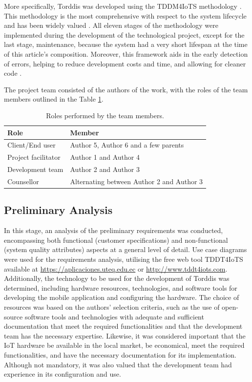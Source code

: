 \documentclass[a4paper,fleqn]{cas-sc}
\begin{document}
		More specifically, Torddis was developed using the TDDM4IoTS methodology \citep{Guerrero-Ulloa2020TDDM4IoTS}. This methodology is the most comprehensive with respect to the system lifecycle \citep{Guerrero-Ulloa2023Review} and has been widely valued \citep{Guerrero-Ulloa2023DevIdeAir,Guerrero-Ulloa2023IdeAir,Guerrero-Ulloa2023SP4,Guerrero-Ulloa2023Nawi}. All eleven stages of the methodology were implemented during the development of the technological project, except for the last stage, maintenance, because the system had a very short lifespan at the time of this article's composition. Moreover, this framework aids in the early detection of errors, helping to reduce development costs and time, and allowing for cleaner code \citep{Beck2002TDD}.
		
		The project team consisted of the authors of the work, with the roles of the team members outlined in the Table \ref{tab:Roles}.
		
		\begin{table}[H]
			\caption{Roles performed by the team members.\label{tab:Roles}}
			\begin{tabularx}{0.8\textwidth}{>{\arraybackslash}X >{\arraybackslash}X}
				\toprule
				\textbf{Role}	& \textbf{Member}\\
				\midrule
				Client/End user & Author 5, Author 6 and a few parents\\
				Project facilitator		&  Author 1 and Author 4\\
				Development team		&  Author 2 and Author 3\\
				Counsellor		&  Alternating between Author 2 and Author 3\\
				\bottomrule
			\end{tabularx}
		\end{table}
		
		\subsection{Preliminary Analysis}
			In this stage, an analysis of the preliminary requirements was conducted, encompassing both functional (customer specifications) and non-functional (system quality attributes) aspects at a general level of detail. Use case diagrams were used for the requirements analysis, utilising the free web tool TDDT4IoTS available at \href{https://aplicaciones.uteq.edu.ec}{https://aplicaciones.uteq.edu.ec} or \href{http://www.tddt4iots.com}{http://www.tddt4iots.com}. Additionally, the technology to be used for the development of Torddis was determined, including hardware resources, technologies, and software tools for developing the mobile application and configuring the hardware. The choice of resources was based on the authors' selection criteria, such as the use of open-source software tools and technologies with adequate and sufficient documentation that meet the required functionalities and that the development team has the necessary expertise. Likewise, it was considered important that the IoT hardware be available in the local market, be economical, meet the required functionalities, and have the necessary documentation for its implementation. Although not mandatory, it was also valued that the development team had experience in its configuration and use.
			
\end{document}
